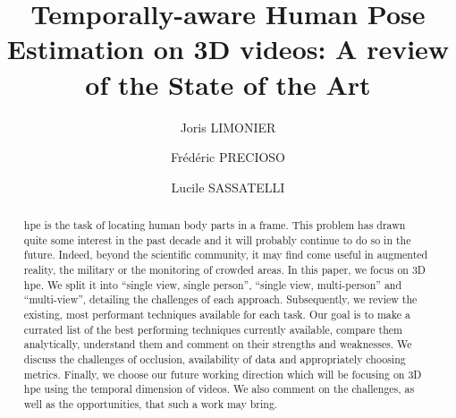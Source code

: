\documentclass[runningheads]{llncs}
\begin{document}
\title{Temporally-aware Human Pose Estimation on 3D videos: A review of the State of the Art}

\author{
  Joris LIMONIER   \and
  Frédéric PRECIOSO   \and
  Lucile SASSATELLI  
}
%
%
%
\maketitle              %
%
\begin{abstract}
  \ac{hpe} is the task of locating human body parts in a frame. This problem has drawn quite some interest in the past decade and it will probably continue to do so in the future. Indeed, beyond the scientific community, it may find come useful in augmented reality, the military or the monitoring of crowded areas. In this paper, we focus on 3D \ac{hpe}. We split it into ``single view, single person'', ``single view, multi-person'' and ``multi-view'', detailing the challenges of each approach. Subsequently, we review the existing, most performant techniques available for each task. Our goal is to make a currated list of the best performing techniques currently available, compare them analytically, understand them and comment on their strengths and weaknesses. We discuss the challenges of occlusion, availability of data and appropriately choosing metrics. Finally, we choose our future working direction which will be focusing on 3D \ac{hpe} using the temporal dimension of videos. We also comment on the challenges, as well as the opportunities, that such a work may bring.
\end{abstract}
\acresetall
\end{document}
